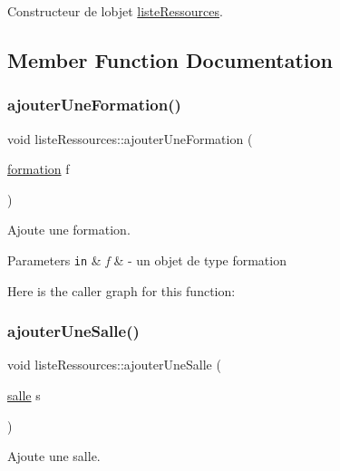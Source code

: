 Constructeur de l\textquotesingle{}objet \hyperlink{classliste_ressources}{liste\+Ressources}. 



\subsection{Member Function Documentation}
\hypertarget{classliste_ressources_a3b12d0a99dedc81a6a9ddfde375f3c3e}{}\label{classliste_ressources_a3b12d0a99dedc81a6a9ddfde375f3c3e} 
\subsubsection{\texorpdfstring{ajouter\+Une\+Formation()}{ajouterUneFormation()}}
{\footnotesize\ttfamily void liste\+Ressources\+::ajouter\+Une\+Formation (\begin{DoxyParamCaption}\item[{\hyperlink{classformation}{formation}}]{f }\end{DoxyParamCaption})}



Ajoute une formation. 


\begin{DoxyParams}[1]{Parameters}
\mbox{\tt in}  & {\em f} & -\/ un objet de type formation \\
\hline
\end{DoxyParams}
Here is the caller graph for this function\+:
\hypertarget{classliste_ressources_ae5c412bcd7a536081d98181e836d578b}{}\label{classliste_ressources_ae5c412bcd7a536081d98181e836d578b} 
\subsubsection{\texorpdfstring{ajouter\+Une\+Salle()}{ajouterUneSalle()}}
{\footnotesize\ttfamily void liste\+Ressources\+::ajouter\+Une\+Salle (\begin{DoxyParamCaption}\item[{\hyperlink{classsalle}{salle}}]{s }\end{DoxyParamCaption})}



Ajoute une salle. 



